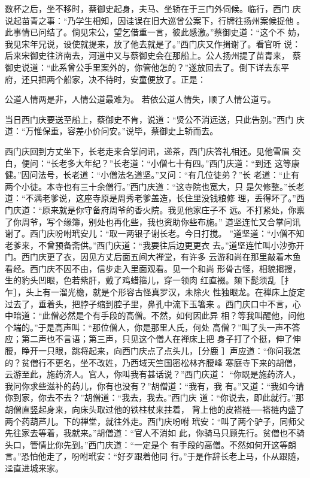 数杯之后，坐不移时，蔡御史起身，夫马、坐轿在于三门外伺候。临行，西门
庆说起苗青之事：“乃学生相知，因诖误在旧大巡曾公案下，行牌往扬州案候捉他
。此事情已问结了。倘见宋公，望乞借重一言，彼此感激。”蔡御史道：“这个不
妨，我见宋年兄说，设使就提来，放了他去就是了。”西门庆又作揖谢了。看官听
说：后来宋御史往济南去，河道中又与蔡御史会在那船上。公人扬州提了苗青来，
蔡御史说道：“此系曾公手里案外的，你管他怎的？”遂放回去了。倒下详去东平
府，还只把两个船家，决不待时，安童便放了。正是：

公道人情两是非，人情公道最难为。
若依公道人情失，顺了人情公道亏。

当日西门庆要送至船上，蔡御史不肯，说道：“贤公不消远送，只此告别。”西门
庆道：“万惟保重，容差小价问安。”说毕，蔡御史上轿而去。

西门庆回到方丈坐下，长老走来合掌问讯，递茶，西门庆答礼相还。见他雪眉
交白，便问：“长老多大年纪？”长老道：“小僧七十有四。”西门庆道：“到还
这等康健。”因问法号，长老道：“小僧法名道坚。”又问：“有几位徒弟？”长
老道：“止有两个小徒。本寺也有三十余僧行。”西门庆道：“这寺院也宽大，只
是欠修整。”长老道：“不满老爹说，这座寺原是周秀老爹盖造，长住里没钱粮修
理，丢得坏了。”西门庆道：“原来就是你守备府周爷的香火院。我见他家庄子不
远。不打紧处，你禀了你周爷，写个缘簿，别处也再化些，我也资助你些布施。”
道坚连忙又合掌问讯谢了。西门庆吩咐玳安儿：“取一两银子谢长老。今日打搅。
”道坚道：“小僧不知老爹来，不曾预备斋供。”西门庆道：“我要往后边更更衣
去。”道坚连忙叫小沙弥开门。西门庆更了衣，因见方丈后面五间大禅堂，有许多
云游和尚在那里敲着木鱼看经。西门庆不因不由，信步走入里面观看。见一个和尚
形骨古怪，相貌搊搜，生的豹头凹眼，色若紫肝，戴了鸡蜡箍儿，穿一领肉
红直裰。颏下髭须乱［扌乍］，头上有一溜光檐，就是个形容古怪真罗汉，未除火
性独眼龙。在禅床上旋定过去了，垂着头，把脖子缩到腔子里，鼻孔中流下玉箸来
。西门庆口中不言，心中暗道：“此僧必然是个有手段的高僧。不然，如何因此异
相？等我叫醒他，问他个端的。”于是高声叫：“那位僧人，你是那里人氏，何处
高僧？”叫了头一声不答应；第二声也不言语；第三声，只见这个僧人在禅床上把
身子打了个挺，伸了伸腰，睁开一只眼，跳将起来，向西门庆点了点头儿，［分鹿
］声应道：“你问我怎的？贫僧行不更名，坐不改姓，乃西域天竺国密松林齐腰峰
寒庭寺下来的胡僧，云游至此，施药济人。官人，你叫我有甚话说？”西门庆道：
“你既是施药济人，我问你求些滋补的药儿，你有也没有？”胡僧道：“我有，我
有。”又道：“我如今请你到家，你去不去？”胡僧道：“我去，我去。”西门庆
道：“你说去，即此就行。”那胡僧直竖起身来，向床头取过他的铁柱杖来拄着，
背上他的皮褡裢──褡裢内盛了两个药葫芦儿。下的禅堂，就往外走。西门庆吩咐
玳安：“叫了两个驴子，同师父先往家去等着，我就来。”胡僧道：“官人不消如
此，你骑马只顾先行。贫僧也不骑头口，管情比你先到。”西门庆道：“一定是个
有手段的高僧。不然如何开这等朗言。”恐怕他走了，吩咐玳安：“好歹跟着他同
行。”于是作辞长老上马，仆从跟随，迳直进城来家。

